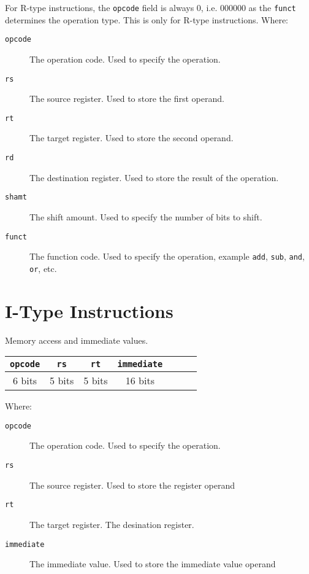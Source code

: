 \documentclass[12pt letter]{report}
\begin{document}
For R-type instructions, the \texttt{opcode} field is always 0, i.e. $000000$ as the \texttt{funct} determines the operation type. This is only for R-type instructions.
Where:
\begin{description}
  \item[\texttt{opcode}] The operation code. Used to specify the operation.
  \item[\texttt{rs}] The source register. Used to store the first operand.
  \item[\texttt{rt}] The target register. Used to store the second operand.
  \item[\texttt{rd}] The destination register. Used to store the result of the operation.
  \item[\texttt{shamt}] The shift amount. Used to specify the number of bits to shift.
  \item[\texttt{funct}] The function code. Used to specify the operation, example \texttt{add}, \texttt{sub}, \texttt{and}, \texttt{or}, etc.
\end{description}

\section{I-Type Instructions}
Memory access and immediate values.

\begin{table}[h!]
  \begin{center}
    \begin{tabular}{|c|c|c|c|c|c|c|}
      \hline
      \texttt{opcode} & \texttt{rs} & \texttt{rt} & \texttt{immediate} \\
      \hline
      6 bits          & 5 bits      & 5 bits      & 16 bits            \\
      \hline
    \end{tabular}
  \end{center}
\end{table}

Where:
\begin{description}
  \item[\texttt{opcode}] The operation code. Used to specify the operation.
  \item[\texttt{rs}] The source register. Used to store the register operand
  \item[\texttt{rt}] The target register. The desination register.
  \item [\texttt{immediate}] The immediate value. Used to store the immediate value operand
\end{description}
\end{document}

